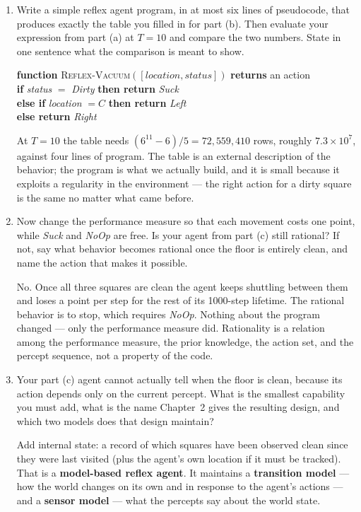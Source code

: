 \documentclass[11pt]{article}
\newif\ifsol
\newcommand{\ans}[1]{\ifsol\relax\else\vspace{#1}\filbreak\fi}
\newenvironment{solution}
  {\ifsol
     \par\vspace{4pt}\noindent
     \color{solgreen}\textbf{Solution.}\enspace\itshape\ignorespaces
   \else
     \setbox0\vbox\bgroup
   \fi}
  {\ifsol\par\normalcolor\upshape\vspace{4pt}\else\egroup\fi}
\begin{document}
\begin{enumerate}[label=(\alph*),leftmargin=*]
\item Write a simple reflex agent program, in at most six lines of pseudocode, that
produces exactly the table you filled in for part (b). Then evaluate your expression from
part (a) at $T=10$ and compare the two numbers. State in one sentence what the comparison
is meant to show.
\ans{1.6in}
\begin{solution}
\begin{tabbing}
\quad\=\textbf{function} \textsc{Reflex-Vacuum}$([\textit{location},\textit{status}])$ \textbf{returns} an action\\
\>\quad \textbf{if} \textit{status} $=$ \textit{Dirty} \textbf{then return} \textit{Suck}\\
\>\quad \textbf{else if} \textit{location} $= C$ \textbf{then return} \textit{Left}\\
\>\quad \textbf{else return} \textit{Right}
\end{tabbing}
At $T=10$ the table needs $(6^{11}-6)/5 = 72{,}559{,}410$ rows, roughly $7.3\times10^{7}$,
against four lines of program. The table is an external description of the behavior; the
program is what we actually build, and it is small because it exploits a regularity in the
environment --- the right action for a dirty square is the same no matter what came before.
\end{solution}

\item Now change the performance measure so that each movement costs one point, while
\textit{Suck} and \textit{NoOp} are free. Is your agent from part (c) still rational? If
not, say what behavior becomes rational once the floor is entirely clean, and name the
action that makes it possible.
\ans{1.2in}
\begin{solution}
No. Once all three squares are clean the agent keeps shuttling between them and loses a
point per step for the rest of its 1000-step lifetime. The rational behavior is to stop,
which requires \textit{NoOp}. Nothing about the program changed --- only the performance
measure did. Rationality is a relation among the performance measure, the prior knowledge,
the action set, and the percept sequence, not a property of the code.
\end{solution}

\item Your part (c) agent cannot actually tell when the floor is clean, because its action
depends only on the current percept. What is the smallest capability you must add, what is
the name Chapter~2 gives the resulting design, and which two models does that design
maintain?
\ans{1.2in}
\begin{solution}
Add internal state: a record of which squares have been observed clean since they were last
visited (plus the agent's own location if it must be tracked). That is a \textbf{model-based
reflex agent}. It maintains a \textbf{transition model} --- how the world changes on its own
and in response to the agent's actions --- and a \textbf{sensor model} --- what the percepts
say about the world state.
\end{solution}


\end{enumerate}
\end{document}
